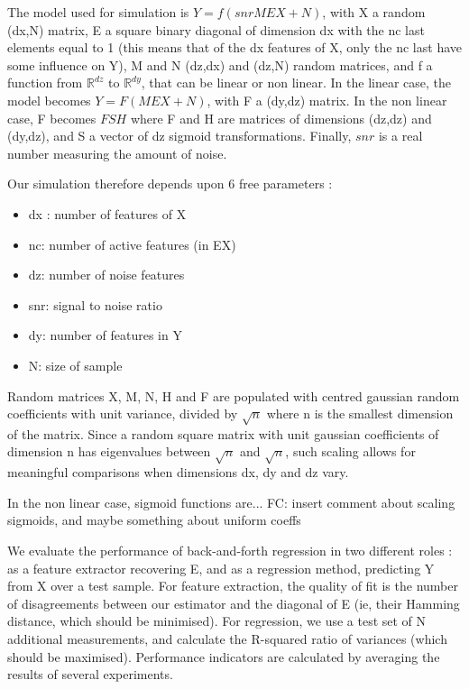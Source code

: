 \documentclass{article}
\begin{document}
The model used for simulation is $Y=f(snr MEX+N)$, with X a random (dx,N) matrix, E a square binary diagonal of dimension dx with the nc last elements equal to 1 (this means that of the dx features of X, only the nc last have some influence on Y), M and N (dz,dx) and (dz,N) random matrices, and f a function from $\mathbb{R}^{dz}$ to $\mathbb{R}^{dy}$, that can be linear or non linear.
%
In the linear case, the model becomes $Y=F(MEX+N)$, with F a (dy,dz) matrix.
%
In the non linear case, F becomes $FSH$ where F and H are matrices of dimensions (dz,dz) and (dy,dz), and S a vector of dz sigmoid transformations.
%
Finally, $snr$ is a real number measuring the amount of noise.

Our simulation therefore depends upon 6 free parameters :
\begin{itemize}
\item dx : number of features of X
\item nc: number of active features (in EX)
\item dz: number of noise features
\item snr: signal to noise ratio
\item dy: number of features in Y
\item N: size of sample
\end{itemize}

Random matrices X, M, N, H and F are populated with centred gaussian random coefficients with unit variance, divided by $ \surd n$ where n is the smallest dimension of the matrix.
%
Since a random square matrix with unit gaussian coefficients of dimension n has eigenvalues between $ \surd n $ and $\surd n $, such  scaling allows for meaningful comparisons when dimensions dx, dy and dz vary.

In the non linear case, sigmoid functions are...
FC: insert comment about scaling sigmoids, and maybe something about uniform coeffs

We evaluate the performance of back-and-forth regression in two different roles : as a feature extractor recovering E, and as a regression method, predicting Y from X over a test sample.
%
For feature extraction, the quality of fit is the number of disagreements between our estimator and the diagonal of E (ie, their Hamming distance, which should be minimised).
%
For regression, we use a test set of N additional measurements, and calculate the R-squared ratio of variances (which should be maximised).
%
Performance indicators are calculated by averaging the results of several experiments.
\end{document}
